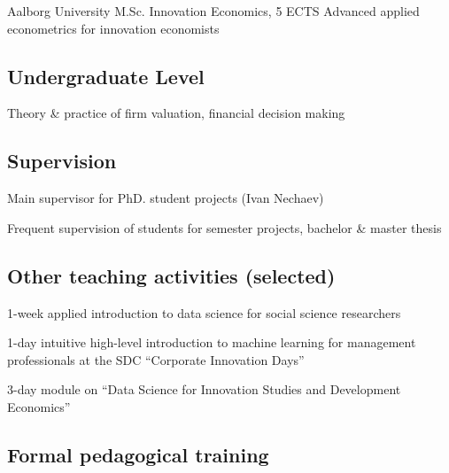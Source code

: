 \documentclass[10pt,a4paper,sans]{moderncv}   %
\begin{document}
 {Aalborg University} {M.Sc. Innovation Economics, 5 ECTS}
{Advanced applied econometrics for innovation economists}


\subsection{Undergraduate Level}

{Theory \& practice of firm valuation, financial decision making}

\subsection{Supervision}

{Main supervisor for PhD. student projects (Ivan Nechaev)} %

{Frequent supervision of students for semester projects, bachelor \& master thesis}

\subsection{Other teaching activities (selected)}

{1-week applied introduction to data science for social science researchers}

{1-day intuitive high-level introduction to machine learning for management professionals at the SDC \enquote{Corporate Innovation Days}}

{3-day module on \enquote{Data Science for Innovation Studies and Development Economics}}


\subsection{Formal pedagogical training}
\end{document}
